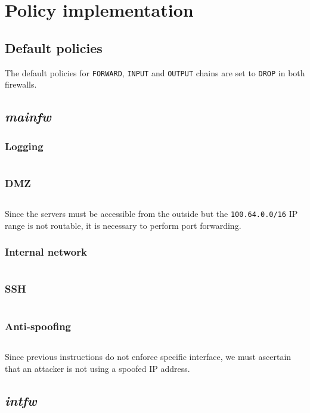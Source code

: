 \documentclass{homework}
\newcommand{\intfw}{\textit{intfw}\xspace}
\newcommand{\mainfw}{\textit{mainfw}\xspace}
\begin{document}
    
    \section{Policy implementation}
    \subsection{Default policies}
    The default policies for \texttt{FORWARD}, \texttt{INPUT} and \texttt{OUTPUT} chains are set to \texttt{DROP} in both firewalls.
    
    \subsection{\mainfw}
    \subsubsection{Logging}
    \inputminted[breakindent=3em, breaklines]{sh}{mainfw/logging}
    
    \subsubsection{DMZ}
    \inputminted[breakindent=3em, breaklines]{sh}{mainfw/dmz}
    Since the servers must be accessible from the outside but the \texttt{100.64.0.0/16} IP range is not routable, it is necessary to perform port forwarding.
    
    \subsubsection{Internal network}
    \inputminted[breakindent=3em, breaklines]{sh}{mainfw/internal}
    
    \subsubsection{SSH}
    \inputminted[breakindent=3em, breaklines]{sh}{mainfw/ssh}
    
    \subsubsection{Anti-spoofing}
    \inputminted[breakindent=3em, breaklines]{sh}{mainfw/spoofing}
    Since previous instructions do not enforce specific interface, we must ascertain that an attacker is not using a spoofed IP address.
    
    \subsection{\intfw}
\end{document}
